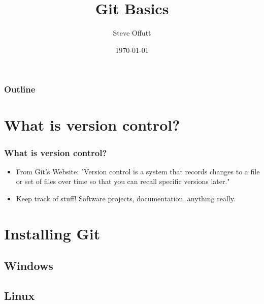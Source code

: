 \documentclass{beamer}
\title{Git Basics}
\author{Steve Offutt}
\institute{OSSEM}
\date{\today}
\begin{document}
\begin{frame}
    \titlepage
\end{frame}

\begin{frame}
    \frametitle{Outline}
    \tableofcontents
\end{frame} 

\section{What is version control?}
\begin{frame}
    \frametitle{What is version control?}
    \begin{itemize}
        \item{From Git's Website:}
            "Version control is a system that records changes to a file or set of files over time so that you can recall specific versions later."
        \item{Keep track of stuff! Software projects, documentation, anything really.}
    \end{itemize}
\end{frame} 

\section{Installing Git}
\subsection{Windows}
\subsection{Linux}
\end{document}
